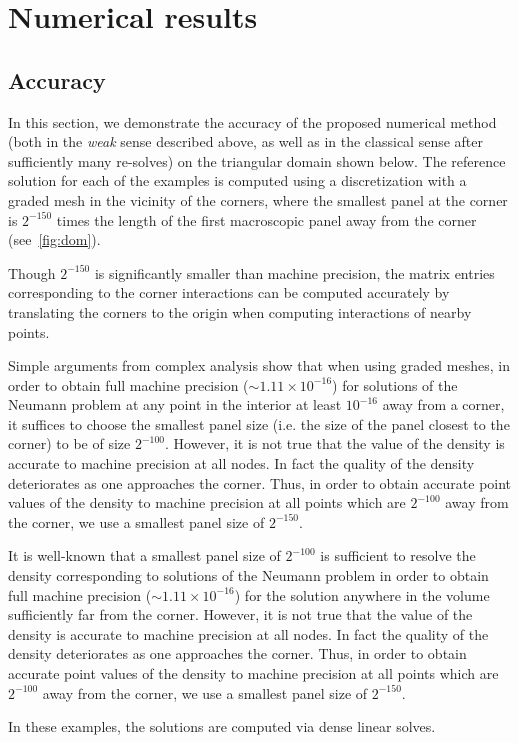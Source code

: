 
\section{Numerical results}
\subsection{Accuracy}
In this section, we demonstrate the accuracy of the proposed numerical method (both in the {\it weak} sense 
described above, 
as well as in the classical sense after sufficiently many re-solves) on the triangular domain shown below. 
The reference solution for each of the examples is computed using a discretization with
a graded mesh in the vicinity of the corners, where the smallest panel at the corner is $2^{-150}$ times
the length of the first macroscopic panel away from the corner (see~\cref{fig:dom}). 
\begin{rem}
Though $2^{-150}$ is significantly smaller than machine precision, the matrix entries corresponding to the
corner interactions can be computed accurately by {\color{red}translating the corners to the origin when 
computing interactions of nearby points.} 
\end{rem} 
\begin{rem}
Simple arguments from complex analysis show that when using graded meshes, in order to obtain full 
machine precision 
($\sim 1.11 \times 10^{-16}$) for solutions of the Neumann problem at any point in the interior 
at least $10^{-16}$ away from a corner, it suffices to choose the smallest panel size (i.e. the size of the 
panel closest to the corner) to be of size $2^{-100}.$ However, it is not true that the value of the density is 
accurate to machine precision at all nodes. In fact the quality
of the density deteriorates as one approaches the corner. Thus, in order to obtain accurate point values
of the density to machine precision at all points which are $2^{-100}$ away from the corner, we use a smallest
panel size of $2^{-150}$. 

It is well-known that a smallest panel size of $2^{-100}$ is sufficient to resolve the density corresponding
to solutions of the Neumann problem in order to obtain full machine precision {\color{red}($\sim 1.11 \times 10^{-16}$)} for the solution anywhere in the volume {\color{red} sufficiently far from the corner.}
However, it is not true that the value of the density is accurate to machine precision at all nodes. In fact the quality
of the density deteriorates as one approaches the corner. Thus, in order to obtain accurate point values
of the density to machine precision at all points which are $2^{-100}$ away from the corner, we use a smallest
panel size of $2^{-150}$. 
\end{rem}
In these examples, the solutions are computed via dense linear solves.

